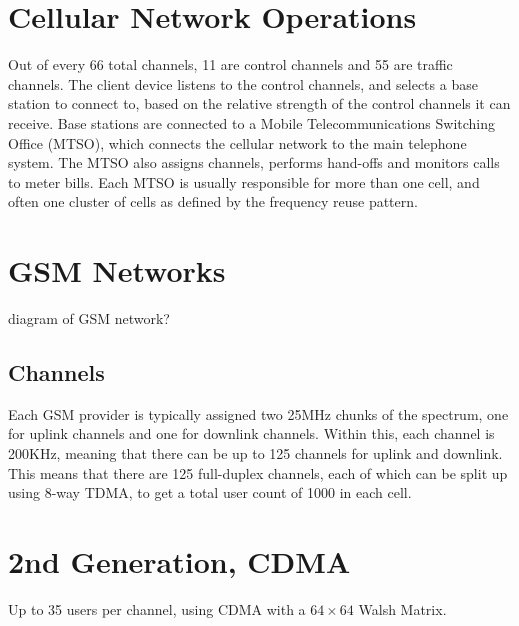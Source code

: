 \section*{Cellular Network Operations}

Out of every 66 total channels, 11 are control channels and 55 are traffic channels. The client device listens to the
 control channels, and selects a base station to connect to, based on the relative strength of the control channels it
 can receive. Base stations are connected to a Mobile Telecommunications Switching Office (MTSO), which connects the
 cellular network to the main telephone system. The MTSO also assigns channels, performs hand-offs and monitors calls
 to meter bills. Each MTSO is usually responsible for more than one cell, and often one cluster of cells as defined by
 the frequency reuse pattern.

\section*{GSM Networks}

{\Huge diagram of GSM network?}

\subsection*{Channels}

Each GSM provider is typically assigned two 25MHz chunks of the spectrum, one for uplink channels and one for downlink
 channels. Within this, each channel is 200KHz, meaning that there can be up to 125 channels for uplink and downlink.
 This means that there are 125 full-duplex channels, each of which can be split up using 8-way TDMA, to get a total user
 count of 1000 in each cell.

\section*{2nd Generation, CDMA}

Up to 35 users per channel, using CDMA with a $64 \times 64$ Walsh Matrix.